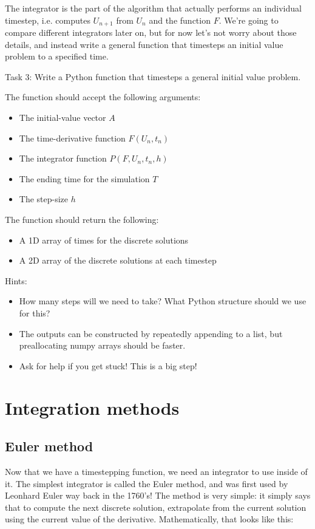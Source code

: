 \documentclass[main.tex]{subfiles}
\begin{document}
The integrator is the part of the algorithm that actually performs an individual timestep, i.e. computes $U_{n+1}$ from $U_n$ and the function $F$.
We're going to compare different integrators later on, but for now let's not worry about those details, and instead write a general function that timesteps an initial value problem to a specified time.

Task 3:
Write a Python function that timesteps a general initial value problem.

The function should accept the following arguments:
\begin{itemize}
    \item The initial-value vector $A$
    \item The time-derivative function $F(U_n, t_n)$
    \item The integrator function $P(F, U_n, t_n, h)$
    \item The ending time for the simulation $T$
    \item The step-size $h$
\end{itemize}

The function should return the following:
\begin{itemize}
    \item A 1D array of times for the discrete solutions
    \item A 2D array of the discrete solutions at each timestep
\end{itemize}

Hints:
\begin{itemize}
    \item How many steps will we need to take?  What Python structure should we use for this?
    \item The outputs can be constructed by repeatedly appending to a list, but preallocating numpy arrays should be faster.
    \item Ask for help if you get stuck!  This is a big step!
\end{itemize}

\section{Integration methods}

\subsection{Euler method}

Now that we have a timestepping function, we need an integrator to use inside of it.
The simplest integrator is called the Euler method, and was first used by Leonhard Euler way back in the 1760's!
The method is very simple: it simply says that to compute the next discrete solution, extrapolate from the current solution using the current value of the derivative.
Mathematically, that looks like this:
\end{document}
